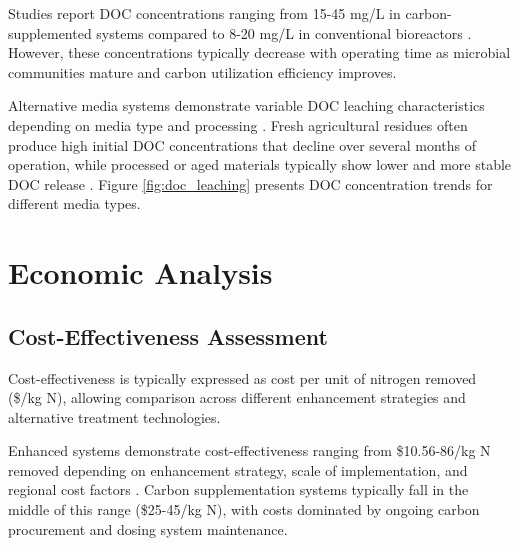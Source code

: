 \documentclass[12pt,a4paper]{article}
\begin{document}
 Studies report DOC concentrations ranging from 15-45 mg/L in carbon-supplemented systems compared to 8-20 mg/L in conventional bioreactors \citep{RN291}. However, these concentrations typically decrease with operating time as microbial communities mature and carbon utilization efficiency improves.

Alternative media systems demonstrate variable DOC leaching characteristics depending on media type and processing \citep{RN242}. Fresh agricultural residues often produce high initial DOC concentrations that decline over several months of operation, while processed or aged materials typically show lower and more stable DOC release \citep{RN348, RN605}. Figure \ref{fig:doc_leaching} presents DOC concentration trends for different media types.


\section{Economic Analysis}

\subsection{Cost-Effectiveness Assessment}

 Cost-effectiveness is typically expressed as cost per unit of nitrogen removed (\$/kg N), allowing comparison across different enhancement strategies and alternative treatment technologies.

Enhanced systems demonstrate cost-effectiveness ranging from \$10.56-86/kg N removed depending on enhancement strategy, scale of implementation, and regional cost factors \citep{RN632, RN350, RN624}.  Carbon supplementation systems typically fall in the middle of this range (\$25-45/kg N), with costs dominated by ongoing carbon procurement and dosing system maintenance.
\end{document}
